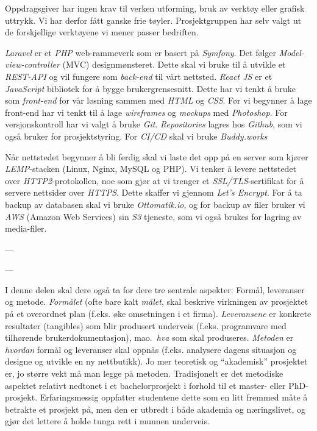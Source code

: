 \documentclass[11pt,a4paper]{report}
\begin{document}
Oppdragsgiver har ingen krav til verken utforming, bruk av verktøy eller grafisk uttrykk. Vi har derfor fått ganske frie tøyler. Prosjektgruppen har selv valgt ut de forskjellige verktøyene vi mener passer bedriften.

\textit{Laravel} er et \textit{PHP} web-rammeverk som er basert på \textit{Symfony}. Det følger \textit{Model-view-controller} (MVC) designmønsteret. Dette skal vi bruke til å utvikle et \textit{REST-API} og vil fungere som \textit{back-end} til vårt nettsted.
\textit{React JS} er et \textit{JavaScript} bibliotek for å bygge brukergrensesnitt. Dette har vi tenkt å bruke som \textit{front-end} for vår løsning sammen med \textit{HTML} og \textit{CSS}. Før vi begynner å lage front-end har vi tenkt til å lage \textit{wireframes} og \textit{mockups} med \textit{Photoshop}.
For versjonskontroll har vi valgt å bruke \textit{Git}.
\textit{Repositories} lagres hos \textit{Github}, som vi også bruker for prosjektstyring. For  \textit{CI/CD} skal vi bruke \textit{Buddy.works}

Når nettstedet begynner å bli ferdig skal vi laste det opp på en server som kjører \textit{LEMP}-stacken (Linux, Nginx, MySQL og PHP). Vi tenker å levere nettstedet over \textit{HTTP2}-protokollen, noe som gjør at vi trenger et \textit{SSL/TLS}-sertifikat for å servere nettsider over \textit{HTTPS}. Dette skaffer vi gjennom \textit{Let's Encrypt}. For å ta backup av databasen skal vi bruke \textit{Ottomatik.io}, og for backup av filer bruker vi \textit{AWS} (Amazon Web Services) sin \textit{S3} tjeneste, som vi også brukes for lagring av media-filer.

---






---

I denne delen skal dere også ta for dere  tre sentrale aspekter: Formål, leveranser og metode. {\em Formålet} (ofte bare kalt {\em målet}, skal beskrive virkningen av prosjektet på et overordnet plan (f.eks. øke omsetningen i et firma). 
{\em Leveransene} er konkrete resultater (tangibles) som blir produsert underveis (f.eks. programvare med tilhørende brukerdokumentasjon), mao.\ {\em hva} som skal produseres. 
{\em Metoden} er {\em hvordan} formål og leveranser skal oppnås (f.eks. analysere dagens situasjon og designe og utvikle en ny nettbutikk). 
Jo mer teoretisk og ``akademisk'' prosjektet er, jo større vekt må man legge på metoden. Tradisjonelt er det metodiske aspektet relativt nedtonet i et bachelorprosjekt i forhold til et master- eller PhD-prosjekt.
Erfaringsmessig oppfatter studentene dette som en litt fremmed måte å betrakte et prosjekt på, men den er utbredt i både akademia og næringslivet, og gjør det lettere å holde tunga rett i munnen underveis. 
\end{document}
